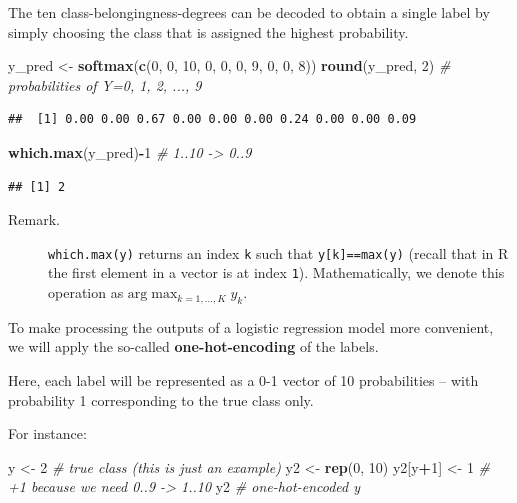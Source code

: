 \documentclass[10pt,b5paper,krantz1]{krantz}
\newenvironment{Shaded}{\begin{snugshade}}{\end{snugshade}}
\newcommand{\CommentTok}[1]{\textcolor[rgb]{0.37,0.37,0.37}{\textit{#1}}}
\newcommand{\DecValTok}[1]{\textcolor[rgb]{0.06,0.06,0.06}{#1}}
\newcommand{\KeywordTok}[1]{\textcolor[rgb]{0.27,0.27,0.27}{\textbf{#1}}}
\newcommand{\NormalTok}[1]{#1}
\newcommand{\OperatorTok}[1]{\textcolor[rgb]{0.43,0.43,0.43}{\textbf{#1}}}
\newcommand{\StringTok}[1]{\textcolor[rgb]{0.5,0.5,0.5}{#1}}
\begin{document}
The ten class-belongingness-degrees can be decoded
to obtain a single label by simply choosing
the class that is assigned the highest probability.

\begin{Shaded}
\begin{Highlighting}[]
\NormalTok{y_pred <-}\StringTok{ }\KeywordTok{softmax}\NormalTok{(}\KeywordTok{c}\NormalTok{(}\DecValTok{0}\NormalTok{, }\DecValTok{0}\NormalTok{, }\DecValTok{10}\NormalTok{, }\DecValTok{0}\NormalTok{, }\DecValTok{0}\NormalTok{, }\DecValTok{0}\NormalTok{, }\DecValTok{9}\NormalTok{,  }\DecValTok{0}\NormalTok{, }\DecValTok{0}\NormalTok{, }\DecValTok{8}\NormalTok{))}
\KeywordTok{round}\NormalTok{(y_pred, }\DecValTok{2}\NormalTok{) }\CommentTok{# probabilities of Y=0, 1, 2, ..., 9}
\end{Highlighting}
\end{Shaded}

\begin{verbatim}
##  [1] 0.00 0.00 0.67 0.00 0.00 0.00 0.24 0.00 0.00 0.09
\end{verbatim}

\begin{Shaded}
\begin{Highlighting}[]
\KeywordTok{which.max}\NormalTok{(y_pred)}\OperatorTok{-}\DecValTok{1} \CommentTok{# 1..10 -> 0..9}
\end{Highlighting}
\end{Shaded}

\begin{verbatim}
## [1] 2
\end{verbatim}

\begin{description}
\item[Remark.]
\texttt{which.max(y)} returns an index \texttt{k} such that
\texttt{y{[}k{]}==max(y)} (recall that in R the first element in
a vector is at index \texttt{1}).
Mathematically, we denote this operation
as \(\mathrm{arg}\max_{k=1,\dots,K} y_k\).
\end{description}

To make processing the outputs of a logistic regression model more convenient,
we will apply the so-called \textbf{one-hot-encoding} of the labels.

Here, each label will be represented as a 0-1 vector
of 10 probabilities -- with probability 1 corresponding
to the true class only.

For instance:

\begin{Shaded}
\begin{Highlighting}[]
\NormalTok{y <-}\StringTok{ }\DecValTok{2} \CommentTok{# true class (this is just an example)}
\NormalTok{y2 <-}\StringTok{ }\KeywordTok{rep}\NormalTok{(}\DecValTok{0}\NormalTok{, }\DecValTok{10}\NormalTok{)}
\NormalTok{y2[y}\OperatorTok{+}\DecValTok{1}\NormalTok{] <-}\StringTok{ }\DecValTok{1} \CommentTok{# +1 because we need 0..9 -> 1..10}
\NormalTok{y2  }\CommentTok{# one-hot-encoded y}
\end{Highlighting}
\end{Shaded}
\end{document}
